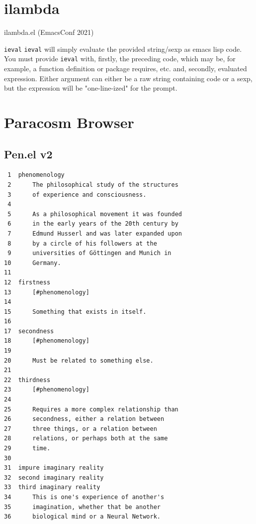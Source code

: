 \documentclass[presentation]{beamer}
\begin{document}
\section{ilambda}
\label{sec:org87c37d5}
\begin{frame}[label={sec:org2366c31},fragile]{ilambda.el (EmacsConf 2021)}
 \begin{block}{\texttt{ieval}}
\texttt{ieval} will simply evaluate the provided
string/sexp as emacs lisp code. You
must provide \texttt{ieval} with, firstly, the preceding
code, which may be, for example, a function
definition or package requires, etc. and,
secondly, evaluated expression. Either
argument can either be a raw string containing
code or a sexp, but the expression will be
"one-line-ized" for the prompt.
\end{block}
\end{frame}

\section{Paracosm Browser}
\label{sec:orga47b176}
\subsection{Pen.el v2}
\label{sec:org29d7d2b}
\begin{verbatim}
 1  phenomenology
 2      The philosophical study of the structures
 3      of experience and consciousness.
 4  
 5      As a philosophical movement it was founded
 6      in the early years of the 20th century by
 7      Edmund Husserl and was later expanded upon
 8      by a circle of his followers at the
 9      universities of Göttingen and Munich in
10      Germany.
11  
12  firstness
13      [#phenomenology]
14  
15      Something that exists in itself.
16  
17  secondness
18      [#phenomenology]
19  
20      Must be related to something else.
21  
22  thirdness
23      [#phenomenology]
24  
25      Requires a more complex relationship than
26      secondness, either a relation between
27      three things, or a relation between
28      relations, or perhaps both at the same
29      time.
30  
31  impure imaginary reality
32  second imaginary reality
33  third imaginary reality
34      This is one's experience of another's
35      imagination, whether that be another
36      biological mind or a Neural Network.
\end{verbatim}
\end{document}
